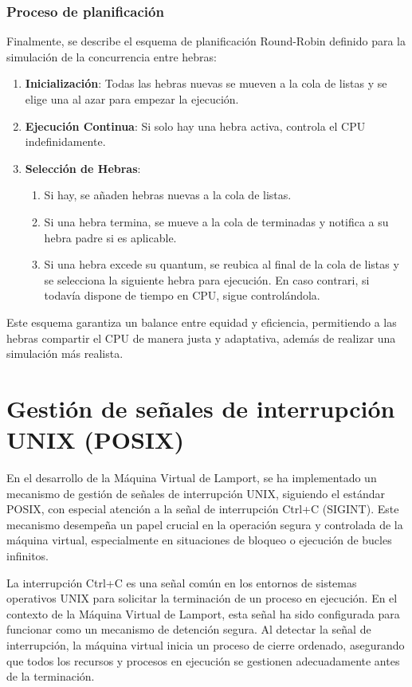 \subsubsection{Proceso de planificación}
Finalmente, se describe el esquema de planificación Round-Robin definido para la simulación de la concurrencia entre hebras:
\begin{enumerate}
    \item \textbf{Inicialización}: Todas las hebras nuevas se mueven a la cola de listas y se elige una al azar para empezar la ejecución.
    \item \textbf{Ejecución Continua}: Si solo hay una hebra activa, controla el CPU indefinidamente.

    \item \textbf{Selección de Hebras}:
    \begin{enumerate}
        \item Si hay, se añaden hebras nuevas a la cola de listas.
        \item Si una hebra termina, se mueve a la cola de terminadas y notifica a su hebra padre si es aplicable.
        \item Si una hebra excede su quantum, se reubica al final de la cola de listas y se selecciona la siguiente hebra para ejecución. En caso contrari, si todavía dispone de tiempo en CPU, sigue controlándola.
    \end{enumerate}

\end{enumerate}

Este esquema garantiza un balance entre equidad y eficiencia, permitiendo a las hebras compartir el CPU de manera justa y adaptativa, además de realizar una simulación más realista.

\section{Gestión de señales de interrupción UNIX (POSIX)}\label{sec:posixSignalsLMP}
En el desarrollo de la Máquina Virtual de Lamport, se ha implementado un mecanismo de gestión de señales de interrupción UNIX, siguiendo el estándar POSIX, con especial atención a la señal de interrupción Ctrl+C (SIGINT). Este mecanismo desempeña un papel crucial en la operación segura y controlada de la máquina virtual, especialmente en situaciones de bloqueo o ejecución de bucles infinitos.

La interrupción Ctrl+C es una señal común en los entornos de sistemas operativos UNIX para solicitar la terminación de un proceso en ejecución. En el contexto de la Máquina Virtual de Lamport, esta señal ha sido configurada para funcionar como un mecanismo de detención segura. Al detectar la señal de interrupción, la máquina virtual inicia un proceso de cierre ordenado, asegurando que todos los recursos y procesos en ejecución se gestionen adecuadamente antes de la terminación.

